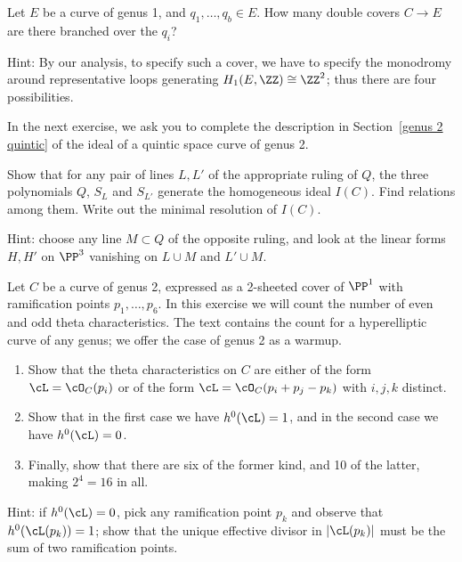 \begin{exercise} Let $E$ be a curve of genus 1, and $q_1,\dots,q_b \in E$. How many double covers $C \to E$ are there branched over the $q_i$?

Hint: By our analysis, to specify such a cover, we have to specify the monodromy around representative loops generating $H_1(E, \ZZ) \cong \ZZ^2$; thus there are four possibilities.
\end{exercise}



In the next exercise, we ask you to complete the description in Section~\ref{genus 2 quintic} of the ideal of a quintic space curve of genus 2.

\begin{exercise}\label{ideal of genus 2 degree 5} 
Show that for any pair of lines $L, L'$ of the appropriate ruling of $Q$, the three polynomials $Q$, $S_L$ and $S_{L'}$ generate the homogeneous ideal $I(C)$. Find relations among them. Write out the minimal resolution of $I(C)$.

Hint: choose any line $M \subset Q$ of the opposite ruling, and look at the linear forms $H, H'$ on $\PP^3$ vanishing on $L \cup M$ and $L' \cup M$.
\end{exercise}


\begin{exercise}\label{theta char on genus 2} %
 Let $C$ be a curve of genus 2, expressed as a 2-sheeted cover of $\PP^1$ with ramification points $p_1,\dots,p_6$. In this exercise we will
 count the number of
 even and odd theta characteristics.
The text contains the count for a hyperelliptic curve of any genus; we offer 
the case of genus 2 as a warmup.
 \begin{enumerate}
 \item Show that the theta characteristics on $C$ are either of the form $\cL = \cO_C(p_i)$ or of the form $\cL = \cO_C(p_i + p_j - p_k)$ with $i, j, k$ distinct. 
 \item Show that in the first case we have $h^0(\cL) = 1$, and in the second case we have $h^0(\cL) = 0$. 
 \item Finally, show that there are six of the former kind, and 10 of the latter, making $2^4 = 16$ in all.
 \end{enumerate} 
 
 Hint: if $h^0(\cL) = 0$, pick any ramification point $p_k$ and observe that $h^0(\cL(p_k)) = 1$; show that  the unique effective divisor in $|\cL(p_k)|$ must be the sum of two ramification points. 
 \end{exercise}
 

